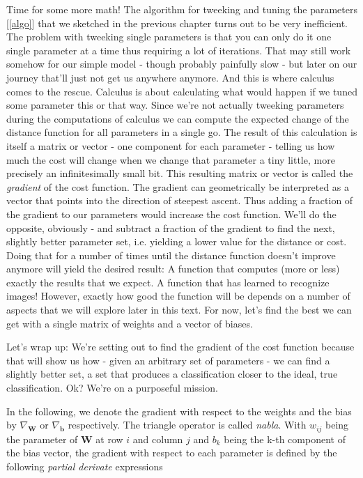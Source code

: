 \documentclass[]{report}
\begin{document}
Time for some more math! The algorithm for tweeking and tuning the parameters [\ref{algo}] that we sketched in the previous chapter turns out to be very inefficient. The problem with tweeking single parameters is that you can only do it one single parameter at a time thus requiring a lot of iterations. That may still work somehow for our simple model - though probably painfully slow - but later on our journey that'll just not get us anywhere anymore. And this is where calculus comes to the rescue. Calculus is about calculating what would happen if we tuned some parameter this or that way. Since we're not actually tweeking parameters during the computations of calculus we can compute the expected change of the distance function for all parameters in a single go. The result of this calculation is itself a matrix or vector - one component for each parameter - telling us how much the cost will change when we change that parameter a tiny little, more precisely an infinitesimally small bit. This resulting matrix or vector is called the \emph{gradient} of the cost function. The gradient can geometrically be interpreted as a vector that points into the direction of steepest ascent. Thus adding a fraction of the gradient to our parameters would increase the cost function. We'll do the opposite, obviously - and subtract a fraction of the gradient to find the next, slightly better parameter set, i.e. yielding a lower value for the distance or cost. Doing that for a number of times until the distance function doesn't improve anymore will yield the desired result: A function that computes (more or less) exactly the results that we expect. A function that has learned to recognize images! However, exactly how good the function will be depends on a number of aspects that we will explore later in this text. For now, let's find the best we can get with a single matrix of weights and a vector of biases.

\bigskip

Let's wrap up: We're setting out to find the gradient of the cost function because that will show us how - given an arbitrary set of parameters - we can find a slightly better set, a set that produces a classification closer to the ideal, true classification. Ok? We're on a purposeful mission.

In the following, we denote the gradient with respect to the weights and the bias by \( \nabla_{\mathbf{W}} \) or \( \nabla_{\mathbf{b}}\) respectively. The triangle operator is called \emph{nabla}. With \(w_{ij}\) being the parameter of \(\mathbf{W} \) at row \(i\) and column \(j\) and \(b_k\) being the k-th component of the bias vector, the gradient with respect to each parameter is defined by the following \emph{partial derivate} expressions
\end{document}

